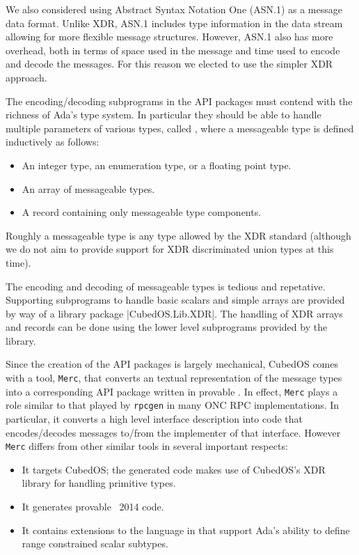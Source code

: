 We also considered using Abstract Syntax Notation One (ASN.1) \cite{asn.1} as a message data
format. Unlike XDR, ASN.1 includes type information in the data stream allowing for more
flexible message structures. However, ASN.1 also has more overhead, both in terms of space used
in the message and time used to encode and decode the messages. For this reason we elected to
use the simpler XDR approach.

The encoding/decoding subprograms in the API packages must contend with the richness of Ada's
type system. In particular they should be able to handle multiple parameters of various types,
called , where a messageable type is defined inductively as follows:

\begin{itemize}
\item An integer type, an enumeration type, or a floating point type.
\item An array of messageable types.
\item A record containing only messageable type components.
\end{itemize}

Roughly a messageable type is any type allowed by the XDR standard (although we do not aim to
provide support for XDR discriminated union types at this time).

The encoding and decoding of messageable types is tedious and repetative. Supporting subprograms
to handle basic scalars and simple arrays are provided by way of a library package
|CubedOS.Lib.XDR|. The handling of XDR arrays and records can be done using the lower level
subprograms provided by the library.

Since the creation of the API packages is largely mechanical, CubedOS comes with a tool,
\texttt{Merc}, that converts an textual representation of the message types into a corresponding
API package written in provable \SPARK. In effect, \texttt{Merc} plays a role similar to that
played by \texttt{rpcgen} in many ONC RPC \cite{rfc-5531} implementations. In particular, it
converts a high level interface description into code that encodes/decodes messages to/from the
implementer of that interface. However \texttt{Merc} differs from other similar tools in several
important respects:

\begin{itemize}
\item It targets CubedOS; the generated code makes use of CubedOS's XDR library for handling
  primitive types.
\item It generates provable \SPARK\ 2014 code.
\item It contains extensions to the language in \cite{rfc-4506} that support Ada's ability to
  define range constrained scalar subtypes.
\end{itemize}

